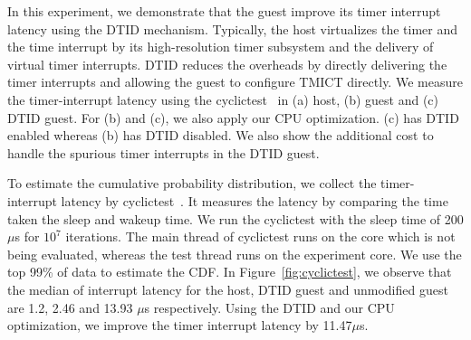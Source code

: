 
In this experiment, we demonstrate that the guest improve its
timer interrupt latency using the DTID mechanism. Typically,
the host virtualizes the timer and the time interrupt by its
high-resolution timer subsystem and the delivery of virtual
timer interrupts. DTID reduces the overheads by directly
delivering the timer interrupts and allowing the guest to
configure TMICT directly. We measure the timer-interrupt
latency using the cyclictest~\cite{cyclictest} in (a) host,
(b) guest and (c) DTID guest. For (b) and (c), we also apply
our CPU optimization. (c) has DTID enabled whereas (b) has
DTID disabled. We also show the additional cost to handle the
spurious timer interrupts in the DTID guest.

To estimate the cumulative probability distribution, we
collect the timer-interrupt latency by
cyclictest~\cite{cyclictest}. It measures the latency by
comparing the time taken the sleep and wakeup time. We run the
cyclictest with the sleep time of 200$\mu$s for $10^7$
iterations. The main thread of cyclictest runs on the core
which is not being evaluated, whereas the test thread runs on
the experiment core. We use the top 99\% of data to estimate
the CDF. In Figure~\ref{fig:cyclictest}, we observe that the
median of interrupt latency for the host, DTID guest and
unmodified guest are 1.2, 2.46 and 13.93 $\mu$s respectively.
Using the DTID and our CPU optimization, we improve the timer
interrupt latency by 11.47$\mu$s.

